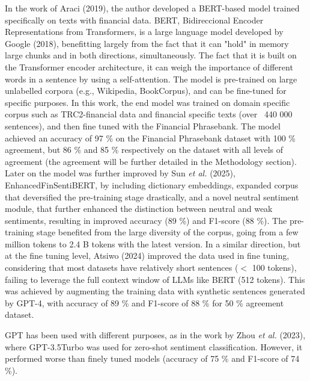 \documentclass[conference]{IEEEtran}
\begin{document}
In the work of Araci (2019), the author developed a BERT-based model trained specifically on texts with financial data. BERT, Bidireccional Encoder Representations from Transformers, is a large language model developed by Google (2018), benefitting largely from the fact that it can "hold" in memory large chunks and in both directions, simultaneously. The fact that it is built on the Transformer encoder architecture, it can weigh the importance of different words in a sentence by using a self-attention. The model is pre-trained  on large unlabelled corpora (e.g., Wikipedia, BookCorpus), and can be fine-tuned for specific purposes. In this work, the end model was trained on  domain specific corpus such as TRC2-financial data and financial specific texts (over ~440 000 sentences), and then fine tuned with the Financial Phrasebank. The model achieved an accuracy of 97 \% on the Financial Phrasebank dataset with 100 \% agreement, but 86 \% and 85 \% respectively on the dataset with all levels of agreement (the agreement will be further detailed in the Methodology section). Later on the model was further improved by Sun \textit{et al.} (2025), EnhancedFinSentiBERT, by including dictionary embeddings, expanded corpus that deversified the pre-training stage drastically, and a novel neutral sentiment module, that further enhanced the distinction between neutral and weak sentiments, resulting in improved accuracy (89 \%) and F1-score (88 \%). The pre-training stage benefited from the large diversity of the corpus, going from a few million tokens to 2.4 B tokens with the latest version. 
In a similar direction, but at the fine tuning level, Atsiwo (2024) improved the data used in fine tuning, considering that most datasets have relatively short sentences ($<$ 100 tokens), failing to leverage the full context window  of LLMs like BERT (512 tokens). This was achieved by augmenting  the training data with synthetic sentences generated by GPT-4, with accuracy of 89 \% and F1-score of 88 \% for 50 \% agreement dataset. 

GPT has been used with different purposes, as in the work by Zhou \textit{et al.} (2023), where GPT-3.5Turbo was used for zero-shot sentiment classification. However, it performed worse than finely tuned models (accuracy of 75 \% and F1-score of 74 \%).
\end{document}
